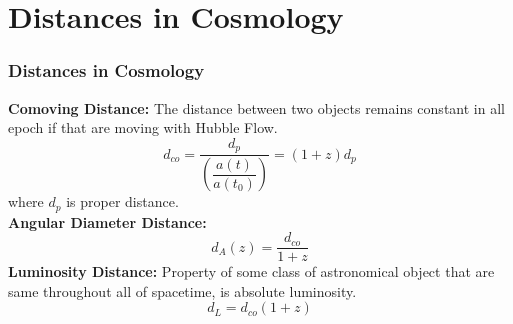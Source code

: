 \documentclass[10pt,xcolor={dvipsnames}]{beamer}
\begin{document}
\section{ Distances in Cosmology}
\begin{frame}
 \frametitle{Distances in Cosmology}
 \vspace{3mm}
 \vspace{3mm}
 \textbf{Comoving Distance: } The distance between two objects remains constant in all epoch if that are moving with Hubble Flow.
$$ d_{c o}=\dfrac{d_{p}}{\left(\dfrac{a(t)}{a\left(t_{0}\right)}\right)}=(1+z) d_{p}$$
where $d_p$ is proper distance.\\
  \textbf{Angular Diameter Distance:} 
$$
 d_{A}\left(z\right)=\dfrac{d_{c o}}{1+z}
 $$
  \textbf{Luminosity Distance:}
Property of some class of astronomical object that are same throughout all of spacetime, is absolute luminosity.
 $$d_{L}=d_{c o}^{}(1+z)$$
 \end{frame}
\end{document}
